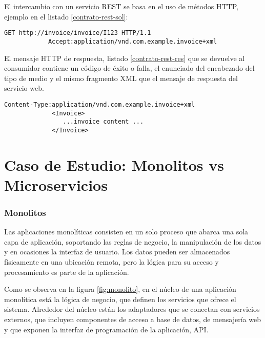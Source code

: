    
    El intercambio  con un servicio REST se basa en el uso de métodos HTTP, ejemplo en el listado \ref{contrato-rest-sol}: 
    	
    	 \begin{lstlisting}[label=contrato-rest-sol, caption=Solicitud en contrato de servicio REST]
    	 	GET http://invoice/invoice/I123 HTTP/1.1
    	 	Accept:application/vnd.com.example.invoice+xml
    	\end{lstlisting}
    	
     El mensaje HTTP de respuesta, listado \ref{contrato-rest-res} que se devuelve al consumidor contiene un código de éxito o falla, el enunciado del encabezado del tipo de medio y el mismo fragmento XML que el mensaje de respuesta del servicio web. 
    
      	 \begin{lstlisting}[label=contrato-rest-res, caption=Respuesta en contrato de servicio REST]
      	 Content-Type:application/vnd.com.example.invoice+xml
	      	 <Invoice>
	      	  	...invoice content ...
	      	 </Invoice>	  	
      	\end{lstlisting}
      	
\section{Caso de Estudio: Monolitos vs Microservicios}


\subsubsection{Monolitos}

Las aplicaciones monolíticas   consisten en un solo proceso que abarca una sola capa de aplicación, soportando las reglas de negocio, la manipulación de los datos y en ocasiones la interfaz de usuario. Los datos pueden ser almacenados físicamente en una ubicación remota, pero la lógica para su acceso y procesamiento es parte de la  aplicación.

Como se observa en la figura \ref{fig:monolito}, en el núcleo de una aplicación monolítica está la lógica de negocio, que definen los servicios que ofrece el sistema. Alrededor del núcleo están los adaptadores que se conectan con servicios externos, que incluyen componentes de acceso a base de datos, de mensajería web y que exponen la interfaz de programación de la aplicación,  API.

